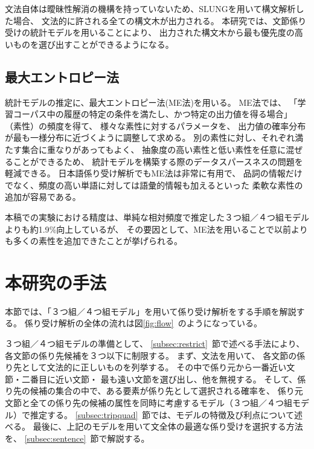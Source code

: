 文法自体は曖昧性解消の機構を持っていないため、SLUNGを用いて構文解析した場合、
文法的に許される全ての構文木が出力される。
本研究では、文節係り受けの統計モデルを用いることにより、
出力された構文木から最も優先度の高いものを選び出すことができるようになる。


\subsection{最大エントロピー法}\label{subsec:me}

統計モデルの推定に、最大エントロピー法(ME法)\cite{Berger96}を用いる。
ME法では、
「学習コーパス中の履歴の特定の条件を満たし、かつ特定の出力値を得る場合」
（素性）の頻度を得て、
様々な素性に対するパラメータを、
出力値の確率分布が最も一様分布に近づくように調整して求める。
別の素性に対し、それぞれ満たす集合に重なりがあってもよく、
抽象度の高い素性と低い素性を任意に混ぜることができるため、
統計モデルを構築する際のデータスパースネスの問題を軽減できる。
日本語係り受け解析でもME法は非常に有用で\cite{Uchimoto99}、
品詞の情報だけでなく、頻度の高い単語に対しては語彙的情報も加えるといった
柔軟な素性の追加が容易である。

本稿での実験における精度は、単純な相対頻度で推定した３つ組／４つ組モデル\cite{Kanayama99}
よりも約1.9$\%$向上しているが、
その要因として、ME法を用いることで以前よりも多くの素性を追加できたことが挙げられる。


\section{本研究の手法}\label{sec:ourmodel}

本節では、「３つ組／４つ組モデル」を用いて係り受け解析をする手順を解説する。
係り受け解析の全体の流れは図\ref{fig:flow}~のようになっている。

３つ組／４つ組モデルの準備として、
\ref{subsec:restrict}~節で述べる手法により、
各文節の係り先候補を３つ以下に制限する。
まず、文法を用いて、
各文節の係り先として文法的に正しいものを列挙する。
その中で係り元から一番近い文節・二番目に近い文節・
最も遠い文節を選び出し、他を無視する。
そして、係り先の候補の集合の中で、ある要素が係り先として選択される確率を、
係り元文節と全ての係り先の候補の属性を同時に考慮するモデル（３つ組／４つ組モデル）で推定する。
\ref{subsec:tripquad}~節では、モデルの特徴及び利点について述べる。
最後に、上記のモデルを用いて文全体の最適な係り受けを選択する方法を、
\ref{subsec:sentence}~節で解説する。


